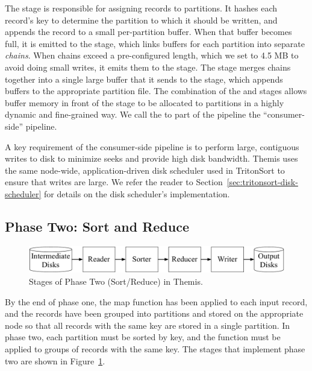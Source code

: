 The \Demuxbf stage is responsible for assigning records to partitions.  It
hashes each record's key to determine the partition to which it should be
written, and appends the record to a small per-partition buffer.  When that
buffer becomes full, it is emitted to the \Chainerbf stage, which links buffers
for each partition into separate \emph{chains}.  When chains exceed a
pre-configured length, which we set to 4.5 MB to avoid doing small writes, it
emits them to the \Coalescerbf stage.  The \Coalescerbf stage merges chains
together into a single large buffer that it sends to the \Writerbf stage,
which appends buffers to the appropriate partition file. The combination of the
\Chainer and \Coalescer stages allows buffer memory in front of the \Writer
stage to be allocated to partitions in a highly dynamic and fine-grained way.
We call the \Receiver to \Writer part of the pipeline the ``consumer-side''
pipeline.

A key requirement of the consumer-side pipeline is to perform large, contiguous
writes to disk to minimize seeks and provide high disk bandwidth.  Themis uses
the same node-wide, application-driven disk scheduler used in TritonSort to
ensure that writes are large. We refer the reader to
Section~\ref{sec:tritonsort-disk-scheduler} for details on the disk scheduler's
implementation.

\subsection{Phase Two: Sort and Reduce}
\label{sec:phase_two}
\label{sec:reduce}

\begin{figure}[h]
\centering
\includegraphics[width=\columnwidth]{themis/figures/phase_two.pdf}
\caption{\label{themis:fig:phase_two} Stages of Phase Two (Sort/Reduce) in Themis.}
\end{figure}

By the end of phase one, the map function has been applied to each input
record, and the records have been grouped into partitions and stored on the
appropriate node so that all records with the same key are stored in a single
partition.  In phase two, each partition must be sorted by key, and the \reduce
function must be applied to groups of records with the same key.  The stages
that implement phase two are shown in Figure~\ref{themis:fig:phase_two}.

